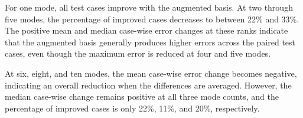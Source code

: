 \begin{table}[htbp]
    \centering
    \caption{Paired comparison of the original and
    augmented POD bases over 100 independent test cases.}
    \label{tab:paired_enrichment_results}
    \scriptsize
    \setlength{\tabcolsep}{3pt}
\end{table}

For one mode, all test cases improve with the augmented
basis. At two through five modes, the percentage of
improved cases decreases to between 22\% and 33\%.
The positive mean and median case-wise error changes
at these ranks indicate that the augmented basis
generally produces higher errors across the paired
test cases, even though the maximum error is reduced
at four and five modes.

At six, eight, and ten modes, the mean case-wise
error change becomes negative, indicating an overall
reduction when the differences are averaged. However,
the median case-wise change remains positive at all
three mode counts, and the percentage of improved
cases is only 22\%, 11\%, and 20\%, respectively.

